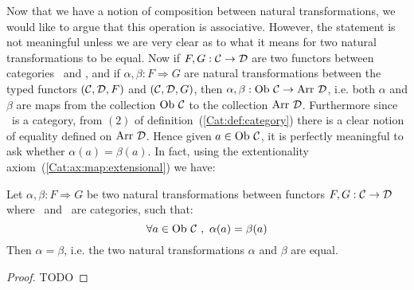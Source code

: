 Now that we have a notion of composition between natural transformations,
we would like to argue that this operation is associative. However, the 
statement is not meaningful unless we are very clear as to what it means
for two natural transformations to be equal. Now if $F,G:\mbox{$\cal C$}\to\mbox{$\cal D$}$ are
two functors between categories \Cat\ and \Dat, and if 
$\alpha,\beta:F\Rightarrow G$ are natural transformations between the 
typed functors $(\mbox{$\cal C$},\mbox{$\cal D$},F)$ and $(\mbox{$\cal C$},\mbox{$\cal D$},G)$, then
$\alpha,\beta:\mbox{\rm Ob}\ \mbox{$\cal C$}\to\mbox{\rm Arr}\ \mbox{$\cal D$}$, i.e. both $\alpha$ and $\beta$
are maps from the collection $\ob\ \Cat$ to the collection $\arr\ \Dat$.
Furthermore since \Dat\ is a category, from $(2)$ of 
definition~(\ref{Cat:def:category}) there is a clear notion of equality 
defined on $\arr\ \Dat$. Hence given $a\in\ob\ \Cat$, it is perfectly 
meaningful to ask whether $\alpha(a)=\beta(a)$. In fact, using the
extentionality axiom~(\ref{Cat:ax:map:extensional}) we have: 
\begin{prop}\label{Nat:prop:equal}
    Let $\alpha,\beta:F\Rightarrow G$ be two natural transformations between
    functors $F,G:\mbox{$\cal C$}\to\mbox{$\cal D$}$ where \Cat\ and \Dat\ are categories, such that:
        \[
            \forall a\in\ob\ \Cat\ ,\ \alpha(a)=\beta(a)
        \]
    Then $\alpha=\beta$, i.e. the two natural transformations $\alpha$
    and $\beta$ are equal.
\end{prop}
\begin{proof}
TODO
\end{proof}
